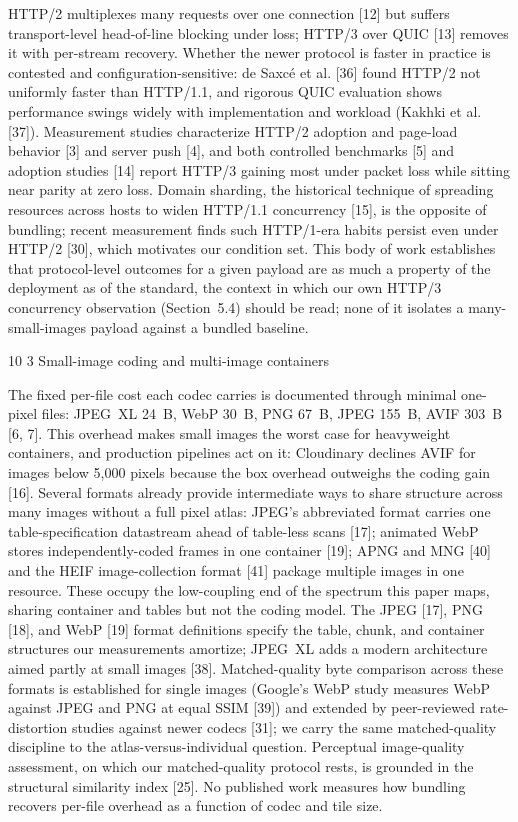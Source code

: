 \documentclass[3p,twocolumn]{elsarticle}
\makeatletter
\renewcommand\subsection{\@startsection{subsection}{2}{\z@}%
           {10\p@ \@plus 3\p@ \@minus 3\p@}%
           {3\p@ \@plus 2\p@ \@minus 1\p@}%
           {\normalfont\normalsize\itshape}}
\makeatother
\begin{document}
HTTP/2 multiplexes many requests over one connection [12] but
suffers transport-level head-of-line blocking under loss; HTTP/3 over
QUIC [13] removes it with per-stream recovery. Whether the newer
protocol is faster in practice is contested and configuration-sensitive:
de Saxcé et al. [36] found HTTP/2 not uniformly faster than
HTTP/1.1, and rigorous QUIC evaluation shows performance swings widely
with implementation and workload (Kakhki et al. [37]). Measurement
studies characterize HTTP/2 adoption and page-load behavior [3] and
server push [4], and both controlled benchmarks [5] and adoption
studies [14] report HTTP/3 gaining most under packet loss while
sitting near parity at zero loss. Domain sharding, the historical
technique of spreading resources across hosts to widen HTTP/1.1
concurrency [15], is the opposite of bundling; recent measurement
finds such HTTP/1-era habits persist even under HTTP/2 [30], which
motivates our condition set. This body of work establishes that
protocol-level outcomes for a given payload are as much a property of
the deployment as of the standard, the context in which our own HTTP/3
concurrency observation (Section~5.4) should be read; none of it
isolates a many-small-images payload against a bundled baseline.

\subsection{Small-image coding and multi-image
containers}

The fixed per-file cost each codec carries is documented through minimal
one-pixel files: JPEG~XL 24~B, WebP 30~B, PNG 67~B, JPEG 155~B, AVIF
303~B [6, 7]. This overhead makes small images the worst case for
heavyweight containers, and production pipelines act on it: Cloudinary
declines AVIF for images below 5,000 pixels because the box overhead
outweighs the coding gain [16]. Several formats already provide
intermediate ways to share structure across many images without a full
pixel atlas: JPEG's abbreviated format carries one
table-specification datastream ahead of table-less scans [17];
animated WebP stores independently-coded frames in one container
[19]; APNG and MNG [40] and the HEIF image-collection format
[41] package multiple images in one resource. These occupy the
low-coupling end of the spectrum this paper maps, sharing container and
tables but not the coding model. The JPEG [17], PNG [18], and
WebP [19] format definitions specify the table, chunk, and container
structures our measurements amortize; JPEG~XL adds a modern architecture
aimed partly at small images [38]. Matched-quality byte comparison
across these formats is established for single images
(Google's WebP study measures WebP against JPEG and PNG
at equal SSIM [39]) and extended by peer-reviewed rate-distortion
studies against newer codecs [31]; we carry the same matched-quality
discipline to the atlas-versus-individual question. Perceptual
image-quality assessment, on which our matched-quality protocol rests,
is grounded in the structural similarity index [25]. No published
work measures how bundling recovers per-file overhead as a function of
codec and tile size.
\end{document}
